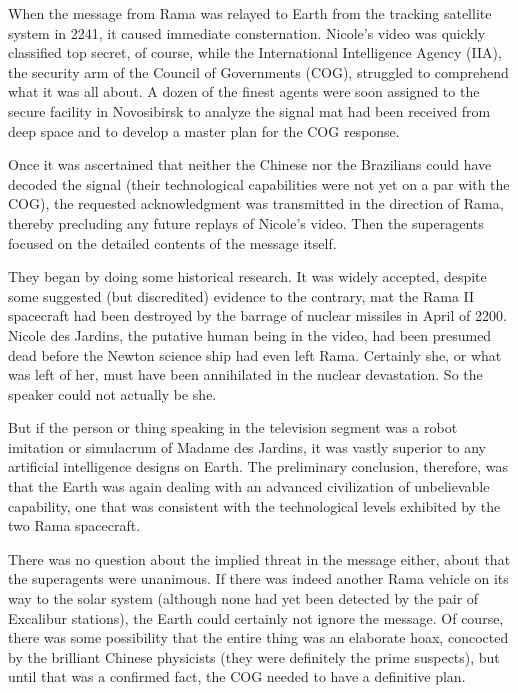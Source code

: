 \documentclass[]{article}
\begin{document}
{When the message from Rama was relayed to Earth from the tracking satellite system in 2241, it caused immediate consternation. Nicole’s video was quickly classified top secret, of course, while the International Intelligence Agency (IIA), the security arm of the Council of Governments (COG), struggled to comprehend what it was all about. A dozen of the finest agents were soon assigned to the secure facility in Novosibirsk to analyze the signal mat had been received from deep space and to develop a master plan for the COG response.

Once it was ascertained that neither the Chinese nor the Brazilians could have decoded the signal (their technological capabilities were not yet on a par with the COG), the requested acknowledgment was transmitted in the direction of Rama, thereby precluding any future replays of Nicole’s video. Then the superagents focused on the detailed contents of the message itself.

They began by doing some historical research. It was widely accepted, despite some suggested (but discredited) evidence to the contrary, mat the Rama II spacecraft had been destroyed by the barrage of nuclear missiles in April of 2200. Nicole des Jardins, the putative human being in the video, had been presumed dead before the Newton science ship had even left Rama. Certainly she, or what was left of her, must have been annihilated in the nuclear devastation. So the speaker could not actually be she.

But if the person or thing speaking in the television segment was a robot imitation or simulacrum of Madame des Jardins, it was vastly superior to any artificial intelligence designs on Earth. The preliminary conclusion, therefore, was that the Earth was again dealing with an advanced civilization of unbelievable capability, one that was consistent with the technological levels exhibited by the two Rama spacecraft.

There was no question about the implied threat in the message either, about that the superagents were unanimous. If there was indeed another Rama vehicle on its way to the solar system (although none had yet been detected by the pair of Excalibur stations), the Earth could certainly not ignore the message. Of course, there was some possibility that the entire thing was an elaborate hoax, concocted by the brilliant Chinese physicists (they were definitely the prime suspects), but until that was a confirmed fact, the COG needed to have a definitive plan.

}
\end{document}
